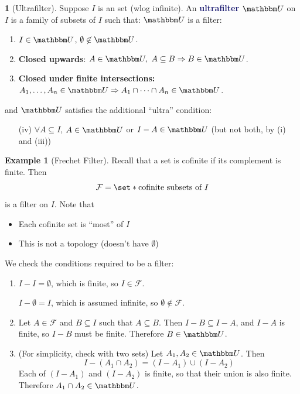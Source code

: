 \documentclass[11pt]{article}
\numberwithin{equation}{section}
\newcommand{\navy}[1]{\textcolor{MidnightBlue}{\bf #1}}
\theoremstyle{plain}
\theoremstyle{definition}
\newtheorem{definition}{\color{MidnightBlue}{\textbf{Definition}}}[section]
\newtheorem{example}{\color{WildStrawberry}Example}[section]
\def\Set{\set*}%
\def\sse{\subseteq}
\def\imp{\Rightarrow}
\newcommand{\1}{\mathbbm 1}
\newcommand{\UU}{\mathbbm U}
\newcommand{\fF}{\mathcal F}
\begin{document}
\begin{definition}[Ultrafilter]
	Suppose $I$ is an set (wlog infinite). An \navy{ultrafilter $\UU$} on $I$ is a family of subsets of $I$ such that:
	$\UU$ is a filter:
	\begin{enumerate}
		\item $I \in \UU$, $\emptyset \not\in \UU$.
		\item \textbf{Closed upwards}: $A \in \UU, \ A \sse B \imp B \in \UU$.
		\item \textbf{Closed under finite intersections:} $A_1, \ldots, A_n \in \UU \imp A_1 \cap \cdots \cap A_n \in \UU$. 
	\end{enumerate}
	and $\UU$ satisfies the additional ``ultra'' condition:
	\begin{enumerate}
		\item[(iv)] $\forall A \sse I$, $A \in \UU$ or $I - A \in \UU$ (but not both, by (i) and (iii))
	\end{enumerate}
\end{definition}

\begin{example}[Frechet Filter]
	Recall that a set is cofinite if its complement is finite. 
	Then
	\begin{equation}
		\fF = \Set{\text{cofinite subsets of $I$}} 
	\end{equation}
	is a filter on $I$. Note that
	\begin{itemize}
		\item Each cofinite set is ``most'' of $I$
		\item This is not a topology (doesn't have $\emptyset$)
	\end{itemize}
	We check the conditions required to be a filter:
	\begin{enumerate}
		\item $I - I = \emptyset$, which is finite, so $I \in \fF$. 

		$I - \emptyset = I$, which is assumed infinite, so $\emptyset \not\in \fF$. 
		\item Let $A \in \fF$ and $B \sse I$ such that $A \sse B$. Then $I - B \sse I - A$, and $I - A$ is finite, so $I - B$ must be finite. Therefore $B \in \UU$. 
		\item (For simplicity, check with two sets) Let $A_1, A_2 \in \UU$. Then 
		\begin{equation}
		 	I - (A_1 \cap A_2) = (I - A_1) \cup (I - A_2)
		\end{equation} 
		Each of $(I - A_1)$ and $(I - A_2)$ is finite, so that their union is also finite. Therefore $A_1 \cap A_2 \in \UU$. 
	\end{enumerate}
\end{example}
\end{document}
